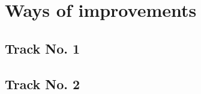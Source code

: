 
\chapter{Ways of improvements}\label{chapter:ways_of_improvements}

\section{Track No. 1}
\section{Track No. 2}